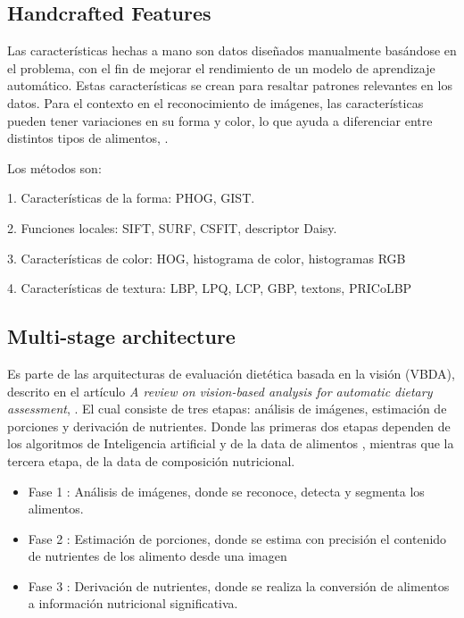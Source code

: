 \subsection{Handcrafted Features}

Las características hechas a mano son datos diseñados manualmente basándose en el problema, con el fin de mejorar el rendimiento de un modelo de aprendizaje automático. Estas características se crean para resaltar patrones relevantes en los datos. Para el contexto en el reconocimiento de imágenes, las características pueden  tener variaciones en su forma y color, lo que ayuda a diferenciar entre distintos tipos de alimentos, \cite{tahir2021comprehensive}.

Los métodos son:

1. Características de la forma: PHOG, GIST.
\thinspace

2. Funciones locales: SIFT, SURF, CSFIT, descriptor Daisy.
\thinspace

3. Características de color: HOG, histograma de color, histogramas RGB
\thinspace

4. Características de textura: LBP, LPQ, LCP, GBP, textons, PRICoLBP
\thinspace

\subsection{Multi-stage architecture} 
Es parte de las arquitecturas de evaluación dietética basada en la visión (VBDA), descrito en el artículo \textit{A review on vision-based analysis for automatic dietary assessment}, \cite{wang2022review}. El cual consiste de tres etapas: análisis de imágenes, estimación de porciones y derivación de nutrientes. Donde las primeras dos etapas dependen de los algoritmos de Inteligencia artificial y de la data de alimentos , mientras que la tercera etapa, de la data de composición nutricional.

\begin{itemize}
    \item Fase 1 : Análisis de imágenes, donde se reconoce, detecta y segmenta los alimentos.
    \item Fase 2 : Estimación de porciones, donde se estima con precisión el contenido de nutrientes de los alimento desde una imagen
    \item Fase 3 : Derivación de nutrientes, donde se realiza la conversión de alimentos a información nutricional significativa.
    
\end{itemize}
